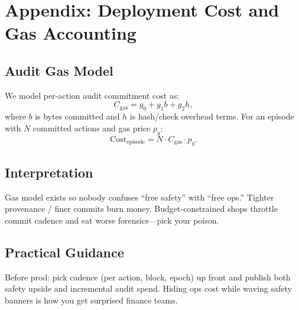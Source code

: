 \section{Appendix: Deployment Cost and Gas Accounting}

\subsection{Audit Gas Model}

We model per-action audit commitment cost as:
\[
C_{\text{gas}} = g_0 + g_1 b + g_2 h,
\]
where $b$ is bytes committed and $h$ is hash/check overhead terms. For an episode with $N$ committed actions and gas price $p_g$:
\[
\text{Cost}_{\text{episode}} = N \cdot C_{\text{gas}} \cdot p_g.
\]

\subsection{Interpretation}

Gas model exists so nobody confuses ``free safety'' with ``free ops.'' Tighter provenance / finer commits burn money. Budget-constrained shops throttle commit cadence and eat worse forensics---pick your poison.

\subsection{Practical Guidance}

Before prod: pick cadence (per action, block, epoch) up front and publish both safety upside and incremental audit spend. Hiding ops cost while waving safety banners is how you get surprised finance teams.
